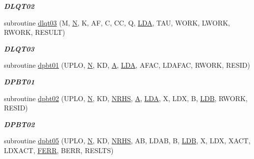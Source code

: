 \begin{DoxyCompactItemize}
\begin{DoxyCompactList}\small\item\em {\bfseries D\+L\+Q\+T02} \end{DoxyCompactList}\item 
subroutine \hyperlink{group__double__lin_gab65b22068bfae3341dd16e46dfd74f3f}{dlqt03} (M, \hyperlink{polmisc_8c_a0240ac851181b84ac374872dc5434ee4}{N}, K, A\+F, C, C\+C, Q, \hyperlink{example__user_8c_ae946da542ce0db94dced19b2ecefd1aa}{L\+D\+A}, T\+A\+U, W\+O\+R\+K, L\+W\+O\+R\+K, R\+W\+O\+R\+K, R\+E\+S\+U\+L\+T)
\begin{DoxyCompactList}\small\item\em {\bfseries D\+L\+Q\+T03} \end{DoxyCompactList}\item 
subroutine \hyperlink{group__double__lin_ga6d32dfa5a4e5850bb33e12b8222bedab}{dpbt01} (U\+P\+L\+O, \hyperlink{polmisc_8c_a0240ac851181b84ac374872dc5434ee4}{N}, K\+D, \hyperlink{classA}{A}, \hyperlink{example__user_8c_ae946da542ce0db94dced19b2ecefd1aa}{L\+D\+A}, A\+F\+A\+C, L\+D\+A\+F\+A\+C, R\+W\+O\+R\+K, R\+E\+S\+I\+D)
\begin{DoxyCompactList}\small\item\em {\bfseries D\+P\+B\+T01} \end{DoxyCompactList}\item 
subroutine \hyperlink{group__double__lin_gad8c416848c97df5476bcbe960e743c78}{dpbt02} (U\+P\+L\+O, \hyperlink{polmisc_8c_a0240ac851181b84ac374872dc5434ee4}{N}, K\+D, \hyperlink{example__user_8c_aa0138da002ce2a90360df2f521eb3198}{N\+R\+H\+S}, \hyperlink{classA}{A}, \hyperlink{example__user_8c_ae946da542ce0db94dced19b2ecefd1aa}{L\+D\+A}, X, L\+D\+X, B, \hyperlink{example__user_8c_a50e90a7104df172b5a89a06c47fcca04}{L\+D\+B}, R\+W\+O\+R\+K, R\+E\+S\+I\+D)
\begin{DoxyCompactList}\small\item\em {\bfseries D\+P\+B\+T02} \end{DoxyCompactList}\item 
subroutine \hyperlink{group__double__lin_ga208912d7f06dd04653e8261b24fa62af}{dpbt05} (U\+P\+L\+O, \hyperlink{polmisc_8c_a0240ac851181b84ac374872dc5434ee4}{N}, K\+D, \hyperlink{example__user_8c_aa0138da002ce2a90360df2f521eb3198}{N\+R\+H\+S}, A\+B, L\+D\+A\+B, B, \hyperlink{example__user_8c_a50e90a7104df172b5a89a06c47fcca04}{L\+D\+B}, X, L\+D\+X, X\+A\+C\+T, L\+D\+X\+A\+C\+T, \hyperlink{superlu__enum__consts_8h_af00a42ecad444bbda75cde1b64bd7e72a78fd14d7abebae04095cfbe02928f153}{F\+E\+R\+R}, B\+E\+R\+R, R\+E\+S\+L\+T\+S)

\end{DoxyCompactItemize}
